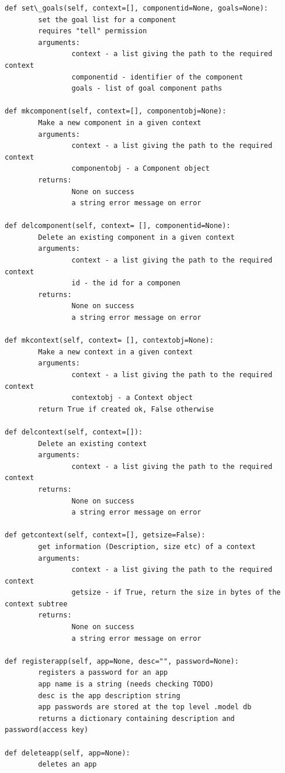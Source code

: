 \documentclass[a4paper,10pt,english]{sphinxmanual}
\begin{document}
\begin{Verbatim}[commandchars=\\\{\}]
def set\_goals(self, context=[], componentid=None, goals=None):
        set the goal list for a component
        requires "tell" permission
        arguments:
                context - a list giving the path to the required context
                componentid - identifier of the component
                goals - list of goal component paths

def mkcomponent(self, context=[], componentobj=None):
        Make a new component in a given context
        arguments:
                context - a list giving the path to the required context
                componentobj - a Component object
        returns:
                None on success
                a string error message on error

def delcomponent(self, context= [], componentid=None):
        Delete an existing component in a given context
        arguments:
                context - a list giving the path to the required context
                id - the id for a componen
        returns:
                None on success
                a string error message on error

def mkcontext(self, context= [], contextobj=None):
        Make a new context in a given context
        arguments:
                context - a list giving the path to the required context
                contextobj - a Context object
        return True if created ok, False otherwise

def delcontext(self, context=[]):
        Delete an existing context
        arguments:
                context - a list giving the path to the required context
        returns:
                None on success
                a string error message on error

def getcontext(self, context=[], getsize=False):
        get information (Description, size etc) of a context
        arguments:
                context - a list giving the path to the required context
                getsize - if True, return the size in bytes of the context subtree
        returns:
                None on success
                a string error message on error

def registerapp(self, app=None, desc="", password=None):
        registers a password for an app
        app name is a string (needs checking TODO)
        desc is the app description string
        app passwords are stored at the top level .model db
        returns a dictionary containing description and password(access key)

def deleteapp(self, app=None):
        deletes an app


\end{Verbatim}
\end{document}

